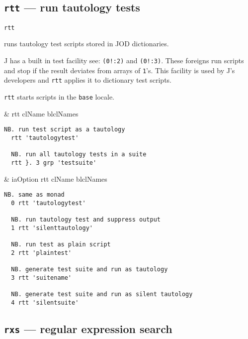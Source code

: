 \subsection{\texttt{rtt} --- run tautology tests}\label{ss:rtt}

\hypertarget{il:rtt}{\texttt{rtt}} runs tautology 
test scripts stored in JOD dictionaries. 

J has a built in test facility see: \verb|(0!:2)| and \verb|(0!:3)|.  
These foreigns run scripts and stop if the result deviates 
from arrays of \texttt{1}'s.  This facility is used by J's developers 
and \texttt{rtt} applies it to dictionary test scripts.  
  
\texttt{rtt} starts scripts in the \texttt{base} locale. 

\begin{wordhead}
\monad & rtt clName \argsep blclNames \\
\end{wordhead}
\begin{lstlisting}[frame=single,framerule=0pt] 
  NB. run test script as a tautology
  rtt 'tautologytest'    
  
  NB. run all tautology tests in a suite 
  rtt }. 3 grp 'testsuite'  
\end{lstlisting}  

\begin{wordhead}
\dyad & iaOption rtt clName \argsep blclNames \\
\end{wordhead}
\begin{lstlisting}[frame=single,framerule=0pt] 
  NB. same as monad
  0 rtt 'tautologytest'    
  
  NB. run tautology test and suppress output 
  1 rtt 'silenttautology'  
  
  NB. run test as plain script
  2 rtt 'plaintest'        
  
  NB. generate test suite and run as tautology 
  3 rtt 'suitename'  
   
  NB. generate test suite and run as silent tautology      
  4 rtt 'silentsuite'      
\end{lstlisting}   

\subsection{\texttt{rxs} --- regular expression search}\label{ss:rxs}

